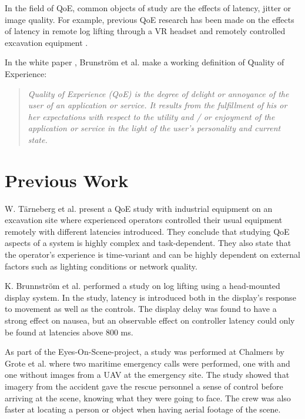 \documentclass[nofilelist]{cslthse-msc}
\begin{document}
In the field of QoE, common objects of study are the effects of latency, jitter or image quality. For example, previous QoE research has been made on the effects of latency in remote log lifting through a VR headset \cite{industry4.0} and remotely controlled excavation equipment \cite{latency-impact}.

In the white paper \cite{qoe-definition}, Brunström et al. make a working definition of Quality of Experience: 

\begin{quote}
   \textit{Quality of Experience (QoE) is the degree of delight or annoyance of the user of an application or service. It results from the fulfillment of his or her expectations with respect to the utility and / or enjoyment of the application or service in the light of the user’s personality and current state.} 
\end{quote}

\section{Previous Work}

W. Tärneberg et al. \cite{industry4.0} present a QoE study with industrial equipment on an excavation site where experienced operators controlled their usual equipment remotely with different latencies introduced. They conclude that studying QoE aspects of a system is highly complex and task-dependent. They also state that the operator's experience is time-variant and can be highly dependent on external factors such as lighting conditions or network quality.

K. Brunnström et al. \cite{latency-impact} performed a study on log lifting using a head-mounted display system. In the study, latency is introduced both in the display's response to movement as well as the controls. The display delay was found to have a strong effect on nausea, but an observable effect on controller latency could only be found at latencies above 800 ms. 

As part of the Eyes-On-Scene-project, a study was performed at Chalmers by Grote et al. \cite{eos-maritime} where two maritime emergency calls were performed, one with and one without images from a UAV at the emergency site. The study showed that imagery from the accident gave the rescue personnel a sense of control before arriving at the scene, knowing what they were going to face. The crew was also faster at locating a person or object when having aerial footage of the scene.
\end{document}
